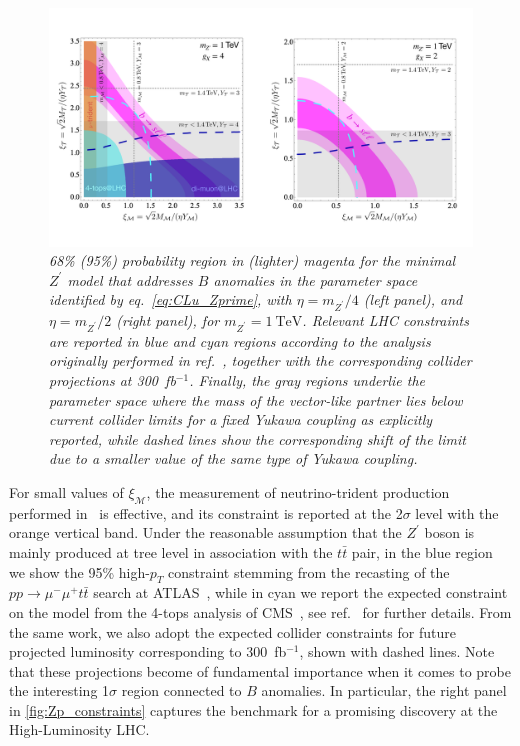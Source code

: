 \begin{figure}[htpb!]
	\includegraphics[scale=0.235]{figures/Zprime_constraint_CLu.pdf}
	\caption{\it 68\% (95\%) probability region in (lighter) magenta for the minimal $Z^{\prime}$ model that addresses $B$ anomalies in the parameter space identified by eq.~\eqref{eq:CLu_Zprime}, with $\eta = m_{Z^{\prime}}/4$ (left panel), and $\eta =  m_{Z^{\prime}}/2$ (right panel), for $m_{Z^{\prime}} = 1~\textrm{TeV}$. Relevant LHC constraints are reported in blue and cyan regions according to the analysis originally performed in ref.~\cite{Camargo-Molina:2018cwu}, together with the corresponding collider projections at 300~fb$^{-1}$. Finally, the gray regions underlie the parameter space where the mass of the vector-like partner lies below current collider limits for a fixed Yukawa coupling as explicitly reported, while dashed lines show the corresponding shift of the limit due to a smaller value of the same type of Yukawa coupling.}    
	\label{fig:Zp_constraints}
\end{figure}

For small values of $\xi_{\mathcal{M}}$, the measurement of neutrino-trident production performed in~\cite{Mishra:1991bv} is effective, and its constraint is reported at the 2$\sigma$ level with the orange vertical band.
Under the reasonable assumption that the $Z^{\prime}$ boson is mainly produced at tree level in association with the $ t \bar{t}$ pair, in the blue region we show the 95\% high-$p_{T}$ constraint stemming from the recasting of the $p p \to \mu^{-} \mu^{+} t \bar{t}  $ search at ATLAS~\cite{Aaboud:2017buh}, while in cyan we report the expected constraint on the model from the 4-tops analysis of CMS~\cite{Sirunyan:2017roi}, see ref.~\cite{Camargo-Molina:2018cwu} for further details. From the same work, we also adopt the expected collider constraints for future projected luminosity corresponding to 300~fb$^{-1}$, shown with dashed lines.  Note that these projections become of fundamental importance when it comes to probe the interesting 1$\sigma$ region connected to $B$ anomalies. 
In particular, the right panel in \autoref{fig:Zp_constraints} captures the benchmark for a promising discovery at the High-Luminosity LHC.

